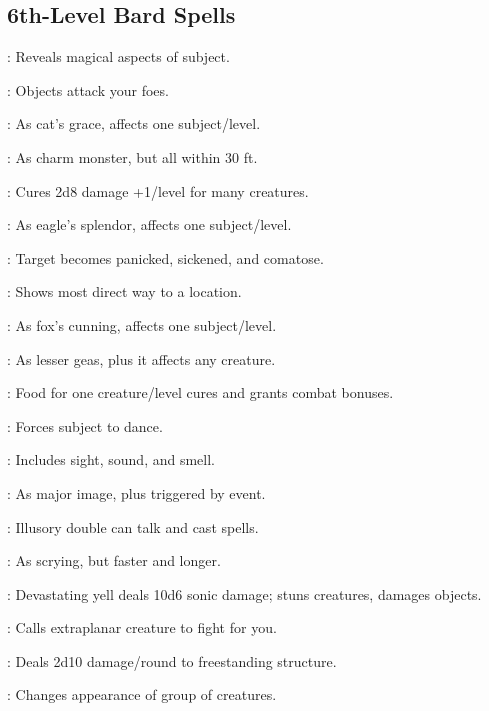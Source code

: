 \begin{multicols}{2}
\subsection{6th-Level Bard Spells}
\begin{description*}
\item[\linkspell{Analyze Dweomer}:] Reveals magical aspects of subject.
\item[\linkspell{Animate Objects}:] Objects attack your foes.
\item[\linkspell{Cat’s Grace, Mass}:] As cat’s grace, affects one subject/level.
\item[\linkspell{Charm Monster, Mass}:] As charm monster, but all within 30 ft.
\item[\linkspell{Cure Moderate Wounds, Mass}:] Cures 2d8 damage +1/level for many creatures.
\item[\linkspell{Eagle’s Splendor, Mass}:] As eagle’s splendor, affects one subject/level.
\item[\linkspell{Eyebite}:] Target becomes panicked, sickened, and comatose.
\item[\linkspell{Find the Path}:] Shows most direct way to a location.
\item[\linkspell{Fox’s Cunning, Mass}:] As fox’s cunning, affects one subject/level.
\item[\linkspell{Geas/Quest}:] As lesser geas, plus it affects any creature.
\item[\linkspell{Heroes’ Feast}:] Food for one creature/level cures and grants combat bonuses.
\item[\linkspell{Otto’s Irresistible Dance}:] Forces subject to dance.
\item[\linkspell{Permanent Image}:] Includes sight, sound, and smell.
\item[\linkspell{Programmed Image}:] As major image, plus triggered by event.
\item[\linkspell{Project Image}:] Illusory double can talk and cast spells.
\item[\linkspell{Scrying, Greater}:] As scrying, but faster and longer.
\item[\linkspell{Shout, Greater}:] Devastating yell deals 10d6 sonic damage; stuns creatures, damages objects.
\item[\linkspell{Summon Monster VI}:] Calls extraplanar creature to fight for you.
\item[\linkspell{Sympathetic Vibration}:] Deals 2d10 damage/round to freestanding structure.
\item[\linkspell{Veil}:] Changes appearance of group of creatures.
\end{description*}

\end{multicols}